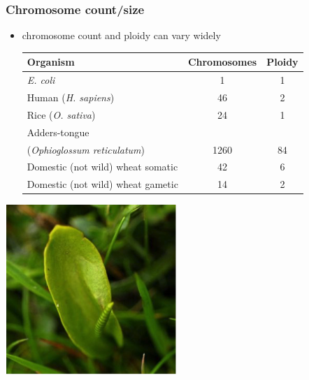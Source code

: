 %
\begin{frame}
  \frametitle{Chromosome count/size
  }
    \begin{itemize}
      \item chromosome count and ploidy can vary widely \\
        \begin{table}
		  \begin{tabular}{l | c | c }
		    Organism & Chromosomes & Ploidy  \\
			\hline \hline
			\textit{E. coli} & 1 & 1  \\ 
			Human (\textit{H. sapiens}) & 46 & 2 \\
			\hline
			Rice (\textit{O. sativa}) & 24 & 1  \\
			Adders-tongue & & \\ 
			(\textit{Ophioglossum reticulatum}) & 1260 & 84 \\
			\hline
			Domestic (not wild) wheat somatic & 42 & 6 \\
			Domestic (not wild) wheat gametic & 14 & 2 \\			
		  \end{tabular}
		\end{table}
	\end{itemize}
  \begin{center}
    \includegraphics[height=0.2\textheight]{images/adders_tongue}
  \end{center}  		
\end{frame}